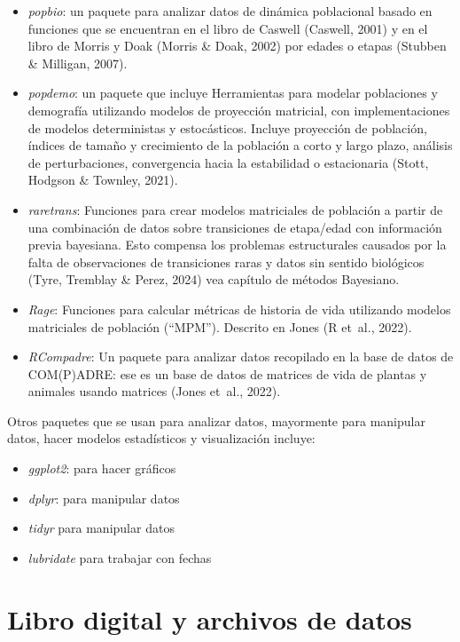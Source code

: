 \documentclass[
  12pt,
  letterpaper,
]{book}
\providecommand{\tightlist}{%
  \setlength{\itemsep}{0pt}\setlength{\parskip}{0pt}}\usepackage{longtable,booktabs,array}
\begin{document}
\begin{itemize}
\item
  \emph{popbio}: un paquete para analizar datos de dinámica poblacional
  basado en funciones que se encuentran en el libro de Caswell (Caswell,
  2001) y en el libro de Morris y Doak (Morris \& Doak, 2002) por edades
  o etapas (Stubben \& Milligan, 2007).
\item
  \emph{popdemo}: un paquete que incluye Herramientas para modelar
  poblaciones y demografía utilizando modelos de proyección matricial,
  con implementaciones de modelos deterministas y estocásticos. Incluye
  proyección de población, índices de tamaño y crecimiento de la
  población a corto y largo plazo, análisis de perturbaciones,
  convergencia hacia la estabilidad o estacionaria (Stott, Hodgson \&
  Townley, 2021).
\item
  \emph{raretrans}: Funciones para crear modelos matriciales de
  población a partir de una combinación de datos sobre transiciones de
  etapa/edad con información previa bayesiana. Esto compensa los
  problemas estructurales causados por la falta de observaciones de
  transiciones raras y datos sin sentido biológicos (Tyre, Tremblay \&
  Perez, 2024) vea capítulo de métodos Bayesiano.
\item
  \emph{Rage}: Funciones para calcular métricas de historia de vida
  utilizando modelos matriciales de población (``MPM''). Descrito en
  Jones (R et~al., 2022).
\item
  \emph{RCompadre}: Un paquete para analizar datos recopilado en la base
  de datos de COM(P)ADRE: ese es un base de datos de matrices de vida de
  plantas y animales usando matrices (Jones et~al., 2022).
\end{itemize}

Otros paquetes que se usan para analizar datos, mayormente para
manipular datos, hacer modelos estadísticos y visualización incluye:

\begin{itemize}
\tightlist
\item
  \emph{ggplot2}: para hacer gráficos
\item
  \emph{dplyr}: para manipular datos
\item
  \emph{tidyr} para manipular datos
\item
  \emph{lubridate} para trabajar con fechas
\end{itemize}

\section{Libro digital y archivos de
datos}\label{libro-digital-y-archivos-de-datos}
\end{document}

